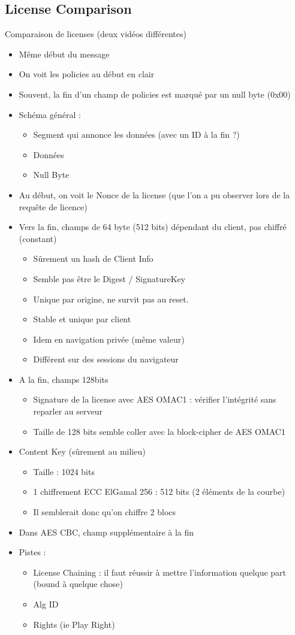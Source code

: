 \documentclass[french]{article}
\begin{document}
\subsection{License Comparison}
Comparaison de licenses (deux vidéos différentes)
\begin{itemize}
	\item Même début du message
	\item On voit les policies au début en clair
	\item Souvent, la fin d'un champ de policies est marqué par un null byte (0x00)
	\item Schéma général : 
	\begin{itemize}
		\item Segment qui annonce les données (avec un ID à la fin ?)
		\item Données
		\item Null Byte
	\end{itemize}
	\item Au début, on voit le Nonce de la license (que l'on a pu observer lors de la requête de licence)
	\item Vers la fin, champs de 64 byte (512 bits) dépendant du client, pas chiffré (constant)
	\begin{itemize}
		\item Sûrement un hash de Client Info
		\item Semble pas être le Digest / SignatureKey
		\item Unique par origine, ne survit pas au reset.
		\item Stable et unique par client
		\item Idem en navigation privée (même valeur)
		\item Différent sur des sessions du navigateur
	\end{itemize}
	\item A la fin, champs 128bits
	\begin{itemize}
		\item Signature de la license avec AES OMAC1 : vérifier l'intégrité sans reparler au serveur
		\item Taille de 128 bits semble coller avec la block-cipher de AES OMAC1
	\end{itemize}
	\item Content Key (sûrement au milieu)
	\begin{itemize}
		\item Taille : 1024 bits
		\item 1 chiffrement ECC ElGamal 256 : 512 bits (2 éléments de la courbe)
		\item Il semblerait donc qu'on chiffre 2 blocs
	\end{itemize}
	\item Dans AES CBC, champ supplémentaire à la fin
	\item Pistes :
	\begin{itemize}
		\item License Chaining : il faut réussir à mettre l'information quelque part (bound à quelque chose)
		\item Alg ID
		\item Rights (ie Play Right)
	\end{itemize}
\end{itemize}
\end{document}
